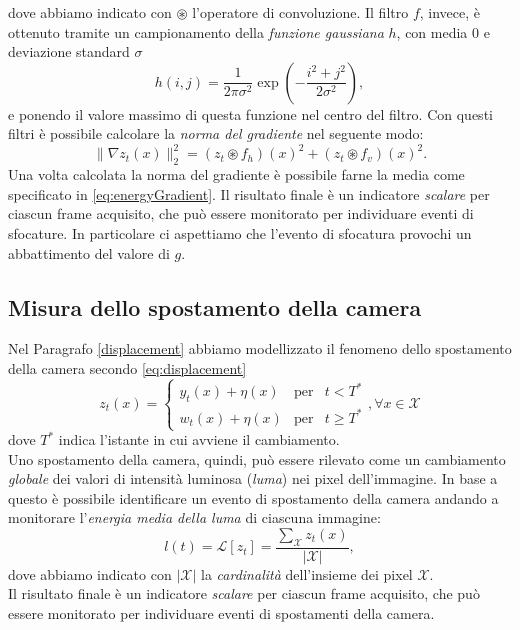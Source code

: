 dove abbiamo indicato con $\circledast$ l'operatore di convoluzione.
Il filtro $f$, invece, \`e ottenuto tramite un campionamento della \textit{funzione gaussiana} $h$, con media $0$ e deviazione standard $\sigma$
\begin{equation}
\label{eq:gaussian}
h(i,j)=\frac{1}{2\pi\sigma^2}\exp\left(-\frac{i^2+j^2}{2\sigma^2}\right),
\end{equation}
e ponendo il valore massimo di questa funzione nel centro del filtro.
Con questi filtri \`e possibile calcolare la \textit{norma del gradiente} nel seguente modo:
\begin{equation}
\label{eq:normaGradiente}
\| \nabla z_t(x) \|_2^2=\left(z_t \circledast f_h\right)(x)^2 + \left(z_t \circledast f_v\right)(x)^2.
\end{equation}
Una volta calcolata la norma del gradiente \`e possibile farne la media come specificato in \eqref{eq:energyGradient}.
Il risultato finale \`e un indicatore \textit{scalare} per ciascun frame acquisito, che pu\`o essere monitorato per individuare eventi di sfocature. 
In particolare ci aspettiamo che l'evento di sfocatura provochi un abbattimento del valore di $g$.
\subsection{Misura dello spostamento della camera}
Nel Paragrafo \ref{displacement} abbiamo modellizzato il fenomeno dello spostamento della camera secondo  \eqref{eq:displacement}
\[z_t(x)  = \left\{ \begin{array}{rcl}
y_t(x) + \eta(x) & \mbox{per} & t < T^* \\
w_t(x) + \eta(x) & \mbox{per} & t \geqslant T^*
\end{array}\right. , \forall x \in \mathcal{X}\]
dove $T^*$ indica l'istante in cui avviene il cambiamento.\\
Uno spostamento della camera, quindi, pu\`o essere rilevato come un cambiamento \textit{globale} dei valori di intensit\`a luminosa (\textit{luma}) nei pixel dell'immagine.
In base a questo \`e possibile identificare un evento di spostamento della camera andando a monitorare l'\textit{energia media della luma} di ciascuna immagine:
\begin{equation}
\label{eq:energyLuma}
l(t) = \mathcal{L}[z_t] =\frac{\sum_{\mathcal{X}} z_t(x) }{|\mathcal{X}|} ,
\end{equation}  
dove abbiamo indicato con $|\mathcal{X}|$ la \textit{cardinalit\`a} dell'insieme dei pixel $\mathcal{X}$.\\
Il risultato finale \`e un indicatore \textit{scalare} per ciascun frame acquisito, che pu\`o essere monitorato per individuare eventi di spostamenti della camera. 
